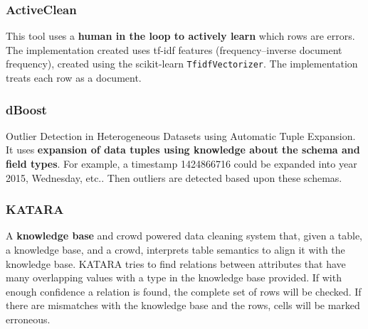 \subsubsection{ActiveClean \cite{Krishnan2016-rg}}
This tool uses a \textbf{human in the loop to actively learn} which rows are errors. The implementation created uses tf-idf features (frequency–inverse document frequency), created using the scikit-learn \verb|TfidfVectorizer|. The implementation treats each row as a document.

\subsubsection{dBoost \cite{Pit--Claudel2016-dj}}
Outlier Detection in Heterogeneous Datasets using Automatic Tuple Expansion. It uses \textbf{expansion of data tuples using knowledge about the schema and field types}. For example, a timestamp 1424866716 could be expanded into year 2015, Wednesday, etc.. Then outliers are detected based upon these schemas.

\subsubsection{KATARA \cite{Chu2015-fs}}
A \textbf{knowledge base} and crowd powered data cleaning system that, given a table, a knowledge base, and a crowd, interprets table semantics to align it with the knowledge base. KATARA tries to find relations between attributes that have many overlapping values with a type in the knowledge base provided. If with enough confidence a relation is found, the complete set of rows will be checked. If there are mismatches with the knowledge base and the rows, cells will be marked erroneous. 


